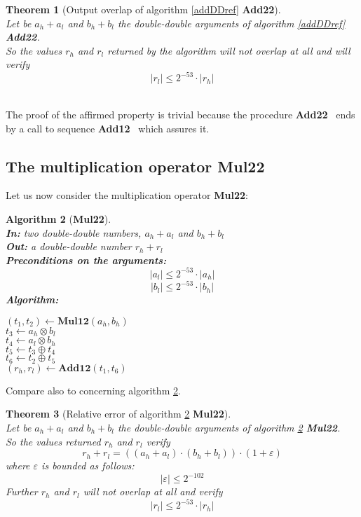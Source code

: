 \documentclass[a4paper,10pt,twoside]{article}
\newtheorem{theorem}{Theorem}[section]
\newtheorem{algorithm}[theorem]{Algorithm}
\newenvironment{proof}[1][Proof]{\begin{trivlist}
\item[\hskip \labelsep {\bfseries #1}]}{\end{trivlist}}
\newcommand{\qed}{\nobreak \ifvmode \relax \else \ifdim \lastskip<1.5em \hskip-\lastskip
\hskip1.5em plus0em minus0.5em \fi \nobreak \vrule height0.75em width0.5em depth0.25em\fi}
\newcommand{\hi}{\ensuremath{\mathit{h}}}
\newcommand{\lo}{\ensuremath{\mathit{l}}}
\newcommand{\Add}{{\bf Add12}}
\newcommand{\AddDD}{{\bf Add22}}
\newcommand{\MulDD}{{\bf Mul22}}
\newcommand{\mAdd}{\ensuremath{\mathbf{Add12}}}
\newcommand{\mMul}{\ensuremath{\mathbf{Mul12}}}
\renewcommand{\epsilon}{\varepsilon}
\begin{document}
\begin{theorem}[Output overlap of algorithm \ref{addDDref} \AddDD] ~ \\
Let be $a_\hi + a_\lo$ and $b_\hi + b_\lo$ the double-double arguments of algorithm \ref{addDDref} \AddDD.\\
So the values $r_\hi$ and $r_\lo$ returned by the algorithm will not overlap
at all and will verify 
$$\left \vert r_\lo \right \vert \leq 2^{-53} \cdot \left \vert r_\hi \right \vert$$
\end{theorem}
\begin{proof} ~\\
The proof of the affirmed property is trivial because the procedure \AddDD~
ends by a call to sequence \Add~ which assures it.\qed 
\end{proof}
\subsection{The multiplication operator \MulDD}
Let us now consider the multiplication operator \MulDD:
\begin{algorithm}[\MulDD] \label{mulDDref} ~ \\
{\bf In:} two double-double numbers, $a_\hi + a_\lo$ and $b_\hi + b_\lo$ \\
{\bf Out:} a double-double number $r_\hi + r_\lo$ \\
{\bf Preconditions on the arguments:} $$\left \vert a_\lo \right \vert \leq 2^{-53} \cdot \left \vert a_\hi \right \vert$$
                            $$\left \vert b_\lo \right \vert \leq 2^{-53} \cdot \left \vert b_\hi \right \vert$$ 
{\bf Algorithm:} \\
\begin{center}
\begin{minipage}[b]{50mm}
$\left( t_1, t_2 \right) \gets \mMul\left( a_\hi, b_\hi \right)$ \\
$t_3 \gets a_\hi \otimes b_\lo$ \\
$t_4 \gets a_\lo \otimes b_\hi$ \\
$t_5 \gets t_3 \oplus t_4$ \\
$t_6 \gets t_2 \oplus t_5$ \\
$\left(r_\hi, r_\lo \right) \gets \mAdd\left( t_1, t_6 \right)$\\
\end{minipage}
\end{center}
\end{algorithm}
Compare also to \cite{crlibmweb} concerning algorithm \ref{mulDDref}.
\begin{theorem}[Relative error of algorithm \ref{mulDDref} \MulDD] ~ \\
Let be $a_\hi + a_\lo$ and $b_\hi + b_\lo$ the double-double arguments of algorithm \ref{mulDDref} \MulDD.\\
So the values returned $r_\hi$ and $r_\lo$ verify
$$r_\hi + r_\lo = \left(\left(a_\hi + a_\lo \right) \cdot \left( b_\hi + b_\lo \right)\right) \cdot \left(1 + \epsilon\right)$$
where $\epsilon$ is bounded as follows:
$$\left \vert \epsilon \right \vert \leq 2^{-102}$$
Further $r_\hi$ and $r_\lo$ will not overlap at all and verify
$$\left \vert r_\lo \right \vert \leq 2^{-53} \cdot \left \vert r_\hi \right \vert$$
\end{theorem}
\end{document}
